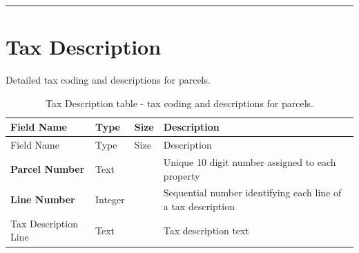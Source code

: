 \documentclass[
  english,
  letterpaper,
  DIV=11,
  numbers=noendperiod]{scrreprt}
\begin{document}
\begin{center}\rule{0.5\linewidth}{0.5pt}\end{center}

\section{Tax Description}\label{tax-description-1}

Detailed tax coding and descriptions for parcels.

\begin{longtable}[]{@{}
  >{\raggedright\arraybackslash}p{}
  >{\raggedright\arraybackslash}p{}
  >{\raggedright\arraybackslash}p{}
  >{\raggedright\arraybackslash}p{}@{}}
\caption{Tax Description table - tax coding and descriptions for
parcels.}\label{tbl-app-tax-description}\tabularnewline
\toprule\noalign{}
\begin{minipage}[b]{\linewidth}\raggedright
Field Name
\end{minipage} & \begin{minipage}[b]{\linewidth}\raggedright
Type
\end{minipage} & \begin{minipage}[b]{\linewidth}\raggedright
Size
\end{minipage} & \begin{minipage}[b]{\linewidth}\raggedright
Description
\end{minipage} \\
\midrule\noalign{}
\endfirsthead
\toprule\noalign{}
\begin{minipage}[b]{\linewidth}\raggedright
Field Name
\end{minipage} & \begin{minipage}[b]{\linewidth}\raggedright
Type
\end{minipage} & \begin{minipage}[b]{\linewidth}\raggedright
Size
\end{minipage} & \begin{minipage}[b]{\linewidth}\raggedright
Description
\end{minipage} \\
\midrule\noalign{}
\endhead
\bottomrule\noalign{}
\endlastfoot
\textbf{Parcel Number} & Text & 10 & Unique 10 digit number assigned to
each property \\
\textbf{Line Number} & Integer & & Sequential number identifying each
line of a tax description \\
Tax Description Line & Text & 200 & Tax description text \\
\end{longtable}
\end{document}
